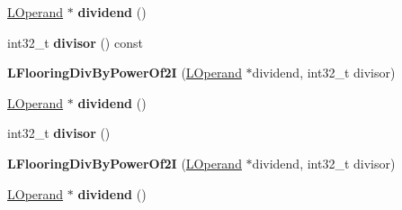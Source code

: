 \begin{DoxyCompactItemize}
\item 
\hyperlink{classv8_1_1internal_1_1_l_operand}{L\+Operand} $\ast$ {\bfseries dividend} ()\hypertarget{classv8_1_1internal_1_1_l_flooring_div_by_power_of2_i_aee291ceb584b7a64ac7eaa1031c2a8cc}{}\label{classv8_1_1internal_1_1_l_flooring_div_by_power_of2_i_aee291ceb584b7a64ac7eaa1031c2a8cc}

\item 
int32\+\_\+t {\bfseries divisor} () const \hypertarget{classv8_1_1internal_1_1_l_flooring_div_by_power_of2_i_a648d12a68de8a628313a5b7cc1c3fbeb}{}\label{classv8_1_1internal_1_1_l_flooring_div_by_power_of2_i_a648d12a68de8a628313a5b7cc1c3fbeb}

\item 
{\bfseries L\+Flooring\+Div\+By\+Power\+Of2I} (\hyperlink{classv8_1_1internal_1_1_l_operand}{L\+Operand} $\ast$dividend, int32\+\_\+t divisor)\hypertarget{classv8_1_1internal_1_1_l_flooring_div_by_power_of2_i_a1dd3730a11d9841227cfb9e917532a0d}{}\label{classv8_1_1internal_1_1_l_flooring_div_by_power_of2_i_a1dd3730a11d9841227cfb9e917532a0d}

\item 
\hyperlink{classv8_1_1internal_1_1_l_operand}{L\+Operand} $\ast$ {\bfseries dividend} ()\hypertarget{classv8_1_1internal_1_1_l_flooring_div_by_power_of2_i_aee291ceb584b7a64ac7eaa1031c2a8cc}{}\label{classv8_1_1internal_1_1_l_flooring_div_by_power_of2_i_aee291ceb584b7a64ac7eaa1031c2a8cc}

\item 
int32\+\_\+t {\bfseries divisor} ()\hypertarget{classv8_1_1internal_1_1_l_flooring_div_by_power_of2_i_add8008d5ac66988cdbd9cec436d070e0}{}\label{classv8_1_1internal_1_1_l_flooring_div_by_power_of2_i_add8008d5ac66988cdbd9cec436d070e0}

\item 
{\bfseries L\+Flooring\+Div\+By\+Power\+Of2I} (\hyperlink{classv8_1_1internal_1_1_l_operand}{L\+Operand} $\ast$dividend, int32\+\_\+t divisor)\hypertarget{classv8_1_1internal_1_1_l_flooring_div_by_power_of2_i_a1dd3730a11d9841227cfb9e917532a0d}{}\label{classv8_1_1internal_1_1_l_flooring_div_by_power_of2_i_a1dd3730a11d9841227cfb9e917532a0d}

\item 
\hyperlink{classv8_1_1internal_1_1_l_operand}{L\+Operand} $\ast$ {\bfseries dividend} ()\hypertarget{classv8_1_1internal_1_1_l_flooring_div_by_power_of2_i_aee291ceb584b7a64ac7eaa1031c2a8cc}{}\label{classv8_1_1internal_1_1_l_flooring_div_by_power_of2_i_aee291ceb584b7a64ac7eaa1031c2a8cc}


\end{DoxyCompactItemize}
